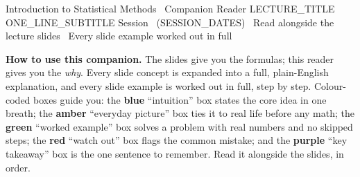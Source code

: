 \thispagestyle{fancy}

\titlebanner
  {Introduction to Statistical Methods \textperiodcentered\ Companion Reader}%
  {{{LECTURE_TITLE}}}                                                        %
  {{{ONE_LINE_SUBTITLE}}}                                                    %
  {Session \SessionNo\ ({{SESSION_DATES}}) \textperiodcentered\ Read alongside the lecture slides \textperiodcentered\ Every slide example worked out in full} %

\noindent\textbf{How to use this companion.}
The slides give you the formulas; this reader gives you the \emph{why}. Every
slide concept is expanded into a full, plain-English explanation, and every
slide example is worked out in full, step by step. Colour-coded boxes guide you:
the \textcolor{intuFrame}{\textbf{blue}} ``intuition'' box states the core idea
in one breath; the \textcolor{everyFrame}{\textbf{amber}} ``everyday picture''
box ties it to real life before any math; the \textcolor{workFrame}{\textbf{green}}
``worked example'' box solves a problem with real numbers and no skipped steps;
the \textcolor{watchFrame}{\textbf{red}} ``watch out'' box flags the common
mistake; and the \textcolor{keyFrame}{\textbf{purple}} ``key takeaway'' box is
the one sentence to remember. Read it alongside the slides, in order.

\medskip

